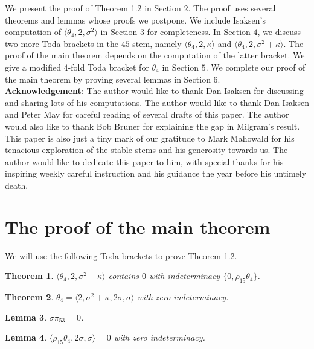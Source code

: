\documentclass[psamsfonts]{amsart}
\newtheorem{thm}{Theorem}[section]
\newtheorem{lem}[thm]{Lemma}
\theoremstyle{definition}
\numberwithin{equation}{section}
\begin{document}
We present the proof of Theorem 1.2 in Section $2$. The proof uses several theorems and lemmas whose proofs we postpone. We include Isaksen's computation of $\langle \theta_4, 2, \sigma^2\rangle$ in Section $3$ for completeness. In Section $4$, we discuss two more Toda brackets in the $45$-stem, namely $\langle \theta_4, 2, \kappa\rangle$ and $\langle \theta_4, 2, \sigma^2+\kappa\rangle$. The proof of the main theorem depends on the computation of the latter bracket.  We give a modified $4$-fold Toda bracket for $\theta_4$ in Section $5$. We complete our proof of the main theorem by proving several lemmas in Section $6$.\\

\textbf{Acknowledgement}: The author would like to thank Dan Isaksen for discussing and sharing lots of his computations. The author would like to thank Dan Isaksen and Peter May for careful reading of several drafts of this paper. The author would also like to thank Bob Bruner for explaining the gap in Milgram's result. This paper is also just a tiny mark of our gratitude to Mark Mahowald for his tenacious exploration of the stable stems and his generosity towards us. The author would like to dedicate this paper to him, with special thanks for his inspiring weekly careful instruction and his guidance the year before his untimely death.

\section{The proof of the main theorem}

We will use the following Toda brackets to prove Theorem 1.2.

\begin{thm}
$\langle \theta_4, 2, \sigma^2+\kappa\rangle$ contains $0$ with indeterminacy $\{0, \rho_{15}\theta_4\}$.
\end{thm}

\begin{thm}
$\theta_4 = \langle 2, \sigma^2 + \kappa, 2 \sigma, \sigma \rangle$ with zero indeterminacy.
\end{thm}

\begin{lem}
$\sigma\pi_{53}=0$.
\end{lem}

\begin{lem}
$\langle\rho_{15}\theta_4, 2\sigma, \sigma\rangle=0$ with zero indeterminacy.
\end{lem}
\end{document}
